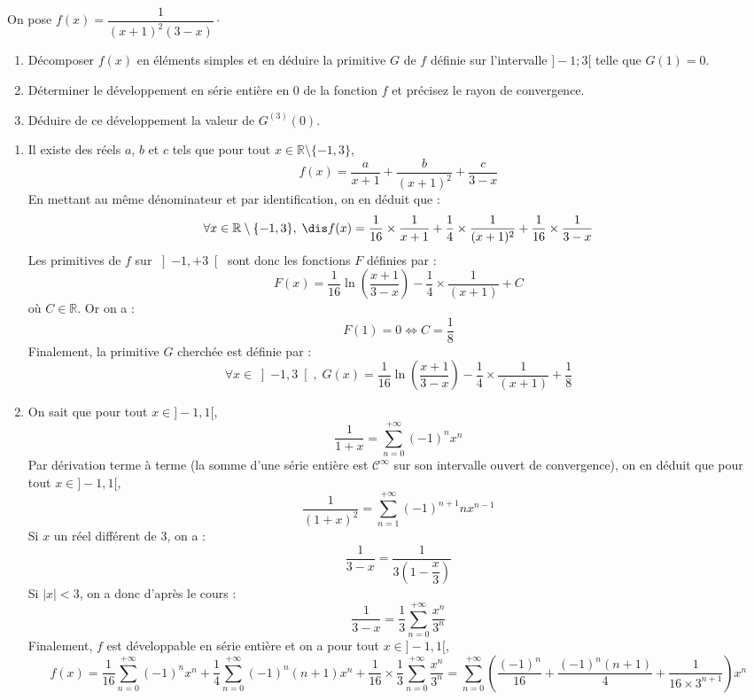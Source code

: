 \documentclass[a4paper,10pt]{report}
\begin{document}
\begin{Exercice}{} On pose $f(x)=\dfrac{1}{(x+1)^{2}(3-x)} \cdot$
\begin{enumerate}
\item Décomposer $f(x)$ en éléments simples et en déduire la primitive $G$ de $f$ définie sur l'intervalle $]-1;3[$ telle que $G(1)=0$.
\item Déterminer le développement en série entière en 0 de la fonction $f$ et précisez le rayon de convergence.
\item Déduire de ce développement la valeur de $G^{(3)}(0)$.
\end{enumerate}
\end{Exercice}

\corr \begin{enumerate}
\item Il existe des réels $a$, $b$ et $c$ tels que pour tout $x \in \mathbb{R} \setminus \lbrace -1,3 \rbrace$,
$$ f(x) = \dfrac{a}{x+1} + \dfrac{b}{(x+1)^2} +  \dfrac{c}{3-x}$$
En mettant au même dénominateur et par identification, on en déduit que :
$$ \forall x \in \mathbb{R} \setminus \lbrace -1,3 \rbrace , \; \dis f(x)=\dfrac{1}{16}\times\dfrac{1}{x+1}+\dfrac{1}{4}\times\dfrac{1}{(x+1)^2}+\dfrac{1}{16}\times\dfrac{1}{3-x}$$
Les primitives de $f$ sur $\left]-1,+3\right[$ sont donc les fonctions $F$ définies par :
$$F(x)=\dfrac{1}{16}\ln \left( \dfrac{x+1}{3-x}\right) -\dfrac{1}{4}\times\dfrac{1}{(x+1)}+C$$
où $C\in\mathbb{R}$. Or on a :
$$F(1)=0\Longleftrightarrow C=\dfrac{1}{8}$$
Finalement, la primitive $G$ cherchée est définie par :
$$ \forall x\in \left]-1,3 \right[ , \; G(x)= \dfrac{1}{16}\ln \left( \dfrac{x+1}{3-x}\right) -\dfrac{1}{4}\times\dfrac{1}{(x+1)}+\dfrac{1}{8}$$
\item On sait que pour tout $x \in ]-1,1[$,
$$\dfrac{1}{1+x}=\sum\limits_{n=0}^{+\infty}(-1)^{n}x^n$$
Par dérivation terme à terme (la somme d'une série entière est $\mathcal{C}^{\infty}$ sur son intervalle ouvert de convergence), on en déduit que pour tout $x \in ]-1,1[$,
$$\dfrac{1}{(1+x)^2}=\sum\limits_{n=1}^{+\infty}(-1)^{n+1}nx^{n-1}$$
Si $x$ un réel différent de $3$, on a :
$$\dfrac{1}{3-x}=\dfrac{1} {3\left( 1-\dfrac{x}{3}\right) }$$
Si $\vert x \vert <3$, on a donc d'après le cours :
$$\dfrac{1}{3-x}=\dfrac{1}{3}\sum\limits_{n=0}^{+\infty}\dfrac{x^n}{3^n}$$
Finalement, $f$ est développable en série entière et on a pour tout $x \in ]-1,1[$,
$$ f(x) = \dfrac{1}{16} \sum\limits_{n=0}^{+\infty}(-1)^{n}x^n
+\dfrac{1}{4}\sum\limits_{n=0}^{+\infty}(-1)^{n}(n+1)x^{n}+\dfrac{1}{16}\times \dfrac{1}{3}\displaystyle\sum\limits_{n=0}^{+\infty}\dfrac{x^n}{3^n} = \displaystyle\sum\limits_{n=0}^{+\infty}\left(\dfrac{(-1)^n}{16}+\dfrac{(-1)^n(n+1)}{4}+\dfrac{1}{16\times3^{n+1}} \right) x^n$$

\end{enumerate}
\end{document}
